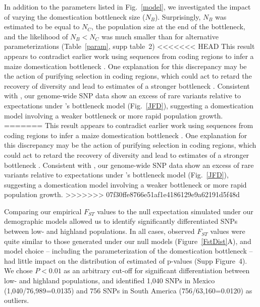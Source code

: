 In addition to the parameters listed in Fig.~\ref{model}, we investigated the impact of varying the domestication bottleneck size ($N_B$).  
Surprisingly, $N_B$ was estimated to be equal to $N_C$, the population size at the end of the bottleneck, and the likelihood of $N_B<N_C$ was much smaller than for alternative parameterizations (Table~\ref{param}, supp table~2) 
<<<<<<< HEAD
This result appears to contradict earlier work using sequences from coding regions to infer a maize domestication bottleneck \cite{Wright_2005_15919994, Tenaillon_2004_15014173}.  One explanation for this discrepancy may be the action of purifying selection in coding regions, which could act to retard the recovery of diversity and lead to estimates of a stronger bottleneck \cite{Hufford_2012_22660546}.  Consistent with \citet{Hufford_2012_22660546}, our genome-wide SNP data show an excess of rare variants relative to expectations under \cite{Wright_2005_15919994}'s bottleneck model (Fig.~\ref{JFD}), suggesting a domestication model involving a weaker bottleneck or more rapid population growth.
=======
This result appears to contradict earlier work using sequences from coding regions to infer a maize domestication bottleneck \citep{Wright_2005_15919994, Tenaillon2004}.  One explanation for this discrepancy may be the action of purifying selection in coding regions, which could act to retard the recovery of diversity and lead to estimates of a stronger bottleneck \citep{Hufford_2012_22660546}.  Consistent with \citet{Hufford_2012_22660546}, our genome-wide SNP data show an excess of rare variants relative to expectations under \citet{Wright_2005_15919994}'s bottleneck model (Fig.~\ref{JFD}), suggesting a domestication model involving a weaker bottleneck or more rapid population growth.
>>>>>>> 07f30ffe8766e51af1e4186129e9a62191d5f48d

Comparing our empirical $F_{ST}$ values to the null expectation simulated under our demographic models allowed us to identify significantly differentiated SNPs between low- and highland populations. In all cases, observed $F_{ST}$ values were quite similar to those generated under our null models  (Figure~\ref{FstDist}A), and model choice -- including the parameterization of the domestication bottleneck -- had little impact on the distribution of estimated of p-values (Supp Figure~4). We chose $P<0.01$ as an arbitrary cut-off for significant differentiation between low- and highland populations, and identified 1,040 SNPs in Mexico (1,040/76,989=0.0135) and 756 SNPs in South America (756/63,160=0.0120) as outliers.  

